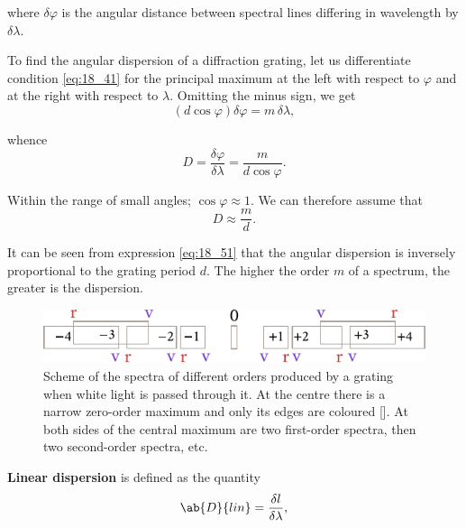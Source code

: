 \noindent
where $\delta{\varphi}$ is the angular distance between spectral lines differing in wavelength by $\delta{\lambda}$.

To find the angular dispersion of a diffraction grating, let us differentiate condition \eqref{eq:18_41} for the principal maximum at the
left with respect to $\varphi$ and at the right with respect to $\lambda$.
Omitting the minus sign, we get
\begin{equation*}
	(d\cos\varphi) \delta{\varphi} = m\, \delta{\lambda},
\end{equation*}

\noindent
whence
\begin{equation}\label{eq:18_50}
	D = \frac{\delta{\varphi}}{\delta{\lambda}} = \frac{m}{d\cos\varphi}.
\end{equation}

\noindent
Within the range of small angles; $\cos\varphi\approx 1$.
We can therefore assume that
\begin{equation}\label{eq:18_51}
	D \approx \frac{m}{d}.
\end{equation}

\noindent
It can be seen from expression \eqref{eq:18_51} that the angular dispersion is inversely proportional to the grating period $d$.
The higher the order $m$ of a spectrum, the greater is the dispersion.

\begin{figure}[t]
	\begin{center}
		\includegraphics[scale=1]{figures/ch_18/fig_18_35.pdf}
        \caption[]{Scheme of the spectra of different orders produced by a grating when white light is passed through it. At the centre there is a narrow zero-order maximum and only its edges are coloured []. At both sides of the central maximum are two first-order spectra, then two second-order spectra, etc.}
		\label{fig:18_35}
	\end{center}
	\vspace{-0.8cm}
\end{figure}

\textbf{Linear dispersion} is defined as the quantity
\begin{equation}\label{eq:18_52}
	\ab{D}{lin} = \frac{\delta{l}}{\delta{\lambda}},
\end{equation}

